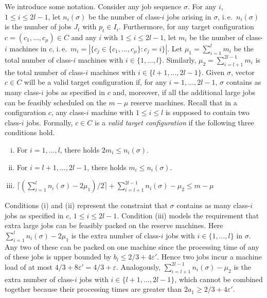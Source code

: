 \documentclass{llncs}
\newcommand{\eps}{\varepsilon}
\begin{document}
We introduce some notation. Consider any job sequence $\sigma$. For any $i$, $1\leq i \leq 2l-1$, let
$n_i(\sigma)$ be the number of class-$i$ jobs arising in $\sigma$, i.\,e.\ $n_i(\sigma)$ is the number of
jobs $J_t$ with $p_t\in I_i$. Furthermore, for any target configuration $c=(c_1, \ldots, c_{\mu})\in C$ and 
any $i$ with $1\leq i \leq 2l-1$, let $m_i$ be the number of class-$i$ machines in $c$, i.\,e.\ 
$m_i = |\{c_j\in \{c_1, \ldots, c_{\mu}\} : c_j = i\}|$. Let $\mu_1 = \sum_{i=1}^l m_i$ be the total 
number of class-$i$ machines with $i\in \{1, \ldots, l\}$. Similarly,  $\mu_2 = \sum_{i=l+1}^{2l-1} m_i$
is the total number of class-$i$ machines with $i\in \{l+1, \ldots, 2l-1\}$. Given $\sigma$, vector
$c\in C$ will be a valid target configuration if, for any $i=1, \ldots, 2l-1$, $\sigma$ contains as
many class-$i$ jobs as specified in $c$ and, moreover, if all the additional large jobs can be feasibly
scheduled on the $m-\mu$ reserve machines. Recall that in a configuration $c$, any class-$i$ machine
with $1\leq i \leq l$ is supposed to contain two class-$i$ jobs. Formally, $c\in C$ is a {\em valid
target configuration\/} if the following three conditions hold.
\begin{enumerate}[(i)]
 \item For $i=1,\ldots, l$, there holds $2m_i \leq n_i(\sigma)$.
 \item For $i=l+1,\ldots, 2l-1$, there holds $m_i \leq n_i(\sigma)$.
 \item $\lceil (\sum_{i=1}^l n_i(\sigma) -2\mu_1) / 2 \rceil + \sum_{i=l+1}^{2l-1} n_i(\sigma) - \mu_2 \leq
        m-\mu$
\end{enumerate}
Conditions (i) and (ii) represent the constraint that $\sigma$ contains as many class-$i$ jobs as specified
in $c$, $1\leq i \leq 2l-1$. Condition (iii) models the requirement that extra large jobs can be feasibly packed
on the reserve machines. Here $\sum_{i=1}^l n_i(\sigma) -2\mu_1$ is the extra number of class-$i$ jobs with
$i\in \{1, \ldots, l\}$ in $\sigma$. Any two of these can be packed on one machine since the processing time
of any of these jobs is upper bounded by $b_l \leq 2/3+4\eps'$. Hence two jobs incur a machine load of
at most $4/3+8\eps' = 4/3 +\eps$. Analogously, $\sum_{i=l+1}^{2l-1} n_i(\sigma) - \mu_2$ is the extra 
number of class-$i$ jobs with  $i\in \{l+1, \ldots, 2l-1\}$, which cannot be combined together because
their processing times are greater than $2a_1 \geq 2/3 + 4\eps'$. 
\end{document}
